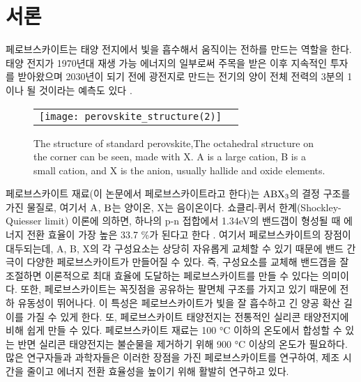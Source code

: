 
\section{서론}

페로브스카이트는 태양 전지에서 빛을 흡수해서 움직이는 전하를 만드는 역할을 한다. 태양 전지가 1970년대 재생 가능 에너지의 일부로써 주목을 받은 이후 지속적인 투자를 받아왔으며 2030년이 되기 전에 광전지로 만드는 전기의 양이 전체 전력의 3분의 1이나 될 것이라는 예측도 있다 \cite{turner2013global}.

\begin{figure}[h!]
	\begin{center}
		\begin{tabular}{cc}
			\texttt{[image: perovskite\_structure(2)]} 
		\end{tabular}
		\caption{The structure of standard perovskite,The octahedral structure on the corner can be seen, made with X. A is a large cation, B is a small cation, and X is the anion, usually hallide and oxide elements.}	
		\label{fig:FIR101}
	\end{center}
\end{figure}

페로브스카이트 재료(이 논문에서 페로브스카이트라고 한다)는 $\rm{ABX_3}$의 결정 구조를 가진 물질로, 여기서 $\rm{A}$, $\rm{B}$는 양이온, X는 음이온이다. 쇼클리-퀴서 한계(Shockley-Quiesser limit) 이론에 의하면, 하나의 p-n 접합에서 1.34eV의 밴드갭이 형성될 때 에너지 전환 효율이 가장 높은 33.7 \%가 된다고 한다 \cite{ruhle2016tabulated}. 여기서 페로브스카이트의 장점이 대두되는데, A, B, X의 각 구성요소는 상당히 자유롭게 교체할 수 있기 때문에 밴드 간극이  다양한 페로브스카이트가 만들어질 수 있다. 즉, 구성요소를 교체해 밴드갭을 잘 조절하면 이론적으로 최대 효율에 도달하는 페로브스카이트를 만들 수 있다는 의미이다. 또한, 페로브스카이트는 꼭짓점을 공유하는 팔면체 구조를 가지고 있기 때문에 전하 유동성이 뛰어나다\cite{linaburg2015studies}. 이 특성은 페로브스카이트가 빛을 잘 흡수하고 긴 양공 확산 길이를 가질 수 있게 한다\cite{green2014emergence}. 또, 페로브스카이트 태양전지는 전통적인 실리콘 태양전지에 비해 쉽게 만들 수 있다. 페로브스카이트 재료는 100 °C 이하의 온도에서 합성할 수 있는 반면 실리콘 태양전지는 불순물을 제거하기 위해 900 °C 이상의 온도가 필요하다.
많은 연구자들과 과학자들은 이러한 장점을 가진 페로브스카이트를 연구하여, 제조 시간을 줄이고 에너지 전환 효율성을 높이기 위해 활발히 연구하고 있다.

